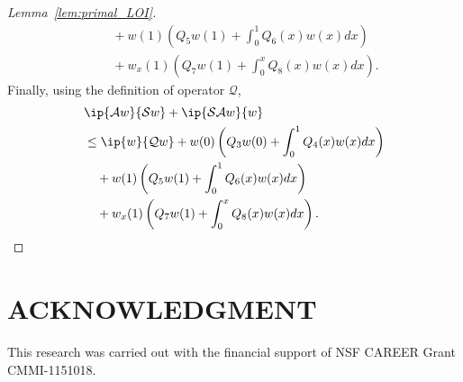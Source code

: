 \documentclass[US letter, 9 pt, conference]{ieeeconf}  \usepackage{setspace}
\newcommand{\igzo}{\int_0^1}
\newcommand{\igzx}{\int_0^x}
\newcommand{\mcl}[1]{\mathcal{#1}}
\begin{document}
\begin{proof}[Lemma~\ref{lem:primal_LOI}]
\begin{align*}
 & \quad +w(1) \left(Q_5 w(1)+\igzo Q_6(x)w(x)dx \right) \\
 &\quad+ w_x(1) \left(Q_7 w(1)+\igzx Q_8(x)w(x)dx \right).
 \end{align*} 
 Finally, using the definition of operator $\mcl{Q}$,
 \begin{align*}
 &\ip{\mathcal{A}w}{\mathcal{S}w}+\ip{\mathcal{S}\mathcal{A}w}{w} \\
 &\leq  \ip{w}{\mcl{Q}w}  + w(0) \left(Q_3 w(0) + \igzo Q_4(x)w(x)dx \right) \\
 & \quad +w(1) \left(Q_5 w(1)+\igzo Q_6(x)w(x)dx \right) \\
 &\quad+ w_x(1) \left(Q_7 w(1)+\igzx Q_8(x)w(x)dx \right).
 \end{align*}
\end{proof}
\section*{ACKNOWLEDGMENT}

This research was carried out with the financial support of NSF CAREER Grant CMMI-1151018.







\end{document}
